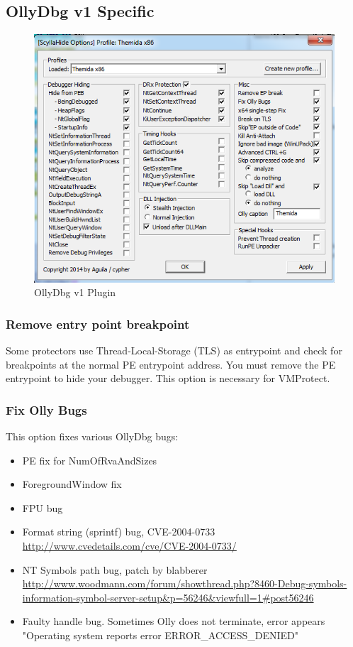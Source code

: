 \documentclass[10pt,a4paper]{article}
\begin{document}
\subsection{OllyDbg v1 Specific}

\begin{figure}[H]
\centering
\includegraphics[scale=1]{ollyv1plugin.PNG}
\caption{OllyDbg v1 Plugin}
\end{figure}

\subsubsection{Remove entry point breakpoint}
Some protectors use Thread-Local-Storage (TLS) as entrypoint and check for breakpoints at the normal PE entrypoint address. You must remove the PE entrypoint to hide your debugger. This option is necessary for VMProtect.
\subsubsection{Fix Olly Bugs}
This option fixes various OllyDbg bugs: 
\begin{itemize}
\item PE fix for NumOfRvaAndSizes
\item ForegroundWindow fix
\item FPU bug
\item Format string (sprintf) bug, CVE-2004-0733 \url{http://www.cvedetails.com/cve/CVE-2004-0733/}
\item NT Symbols path bug, patch by blabberer \url{http://www.woodmann.com/forum/showthread.php?8460-Debug-symbols-information-symbol-server-setup&p=56246&viewfull=1#post56246}
\item Faulty handle bug. Sometimes Olly does not terminate, error appears "Operating system reports error ERROR\_ACCESS\_DENIED"
\end{itemize}
\end{document}
